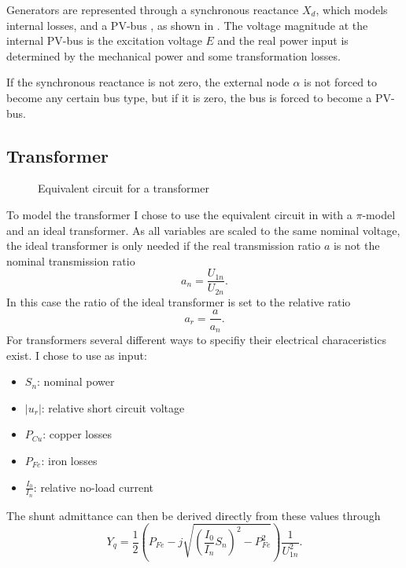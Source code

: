 Generators are represented through a synchronous reactance $X_d$, which models internal losses, and a PV-bus \citep[p. 55]{powerSystemAnalysis}, as shown in . The voltage magnitude at the internal PV-bus is the excitation voltage $E$ and the real power input is determined by the mechanical power and some transformation losses. 

If the synchronous reactance is not zero, the external node $\alpha$ is not forced to become any certain bus type, but if it is zero, the bus is forced to become a PV-bus.

\subsection{Transformer}

\begin{figure}
	\centering
	
	\caption{Equivalent circuit for a transformer}
	\label{fig:transformer}
\end{figure}

To model the transformer I chose to use the equivalent circuit in  with a $\pi$-model and an ideal transformer. As all variables are scaled to the same nominal voltage, the ideal transformer is only needed if the real transmission ratio $a$ is not the nominal transmission ratio
\begin{equation}
	a_n = \frac{U_{1n}}{U_{2n}}.
\end{equation}
In this case the ratio of the ideal transformer is set to the relative ratio
\begin{equation}
	a_r = \frac{a}{a_n}.
\end{equation}
For transformers several different ways to specifiy their electrical characeristics exist. I chose to use as input:
\begin{itemize}
	\item $S_n$: nominal power
	\item $|u_r|$: relative short circuit voltage
	\item $P_{Cu}$: copper losses
	\item $P_{Fe}$: iron losses
	\item $\frac{I_0}{I_n}$: relative no-load current
\end{itemize}

The shunt admittance can then be derived directly from these values through
\begin{equation}
	Y_q = \frac{1}{2} \left( P_{Fe} - j \sqrt{\left( \frac{I_0}{I_n} S_n \right)^2 - P_{Fe}^2} \right) \frac{1}{U_{1n}^2}.
\end{equation}

